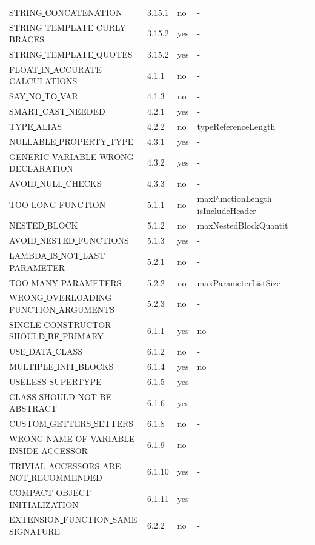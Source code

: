 \begin{center}
\begin{longtable}{ |l|p{0.8cm}|p{0.8cm}| p{3cm} | }
STRING\underline{ }CONCATENATION & 3.15.1 &  no  & - \\
STRING\underline{ }TEMPLATE\underline{ }CURLY\underline{ }BRACES & 3.15.2 &  yes  &  - \\
STRING\underline{ }TEMPLATE\underline{ }QUOTES & 3.15.2 &  yes  &  - \\
FLOAT\underline{ }IN\underline{ }ACCURATE\underline{ }CALCULATIONS & 4.1.1 &  no  &                          - \\
SAY\underline{ }NO\underline{ }TO\underline{ }VAR & 4.1.3 &  no  &  - \\
SMART\underline{ }CAST\underline{ }NEEDED & 4.2.1 &  yes  &  - \\
TYPE\underline{ }ALIAS & 4.2.2 &  no  &  typeReferenceLength       \\
NULLABLE\underline{ }PROPERTY\underline{ }TYPE & 4.3.1 &  yes  &  -                         \\
GENERIC\underline{ }VARIABLE\underline{ }WRONG\underline{ }DECLARATION & 4.3.2 &  yes  &  - \\
AVOID\underline{ }NULL\underline{ }CHECKS & 4.3.3 &  no  &  - \\
TOO\underline{ }LONG\underline{ }FUNCTION & 5.1.1 &  no  &  maxFunctionLength isIncludeHeader\\
NESTED\underline{ }BLOCK & 5.1.2 &  no  &  maxNestedBlockQuantit\\
AVOID\underline{ }NESTED\underline{ }FUNCTIONS & 5.1.3 &  yes  &  - \\
LAMBDA\underline{ }IS\underline{ }NOT\underline{ }LAST\underline{ }PARAMETER & 5.2.1 &  no  &  - \\
TOO\underline{ }MANY\underline{ }PARAMETERS & 5.2.2 &  no  &  maxParameterListSize \\
WRONG\underline{ }OVERLOADING\underline{ }FUNCTION\underline{ }ARGUMENTS & 5.2.3 &  no  &   -\\
SINGLE\underline{ }CONSTRUCTOR\underline{ }SHOULD\underline{ }BE\underline{ }PRIMARY & 6.1.1 &  yes  &  no \\
USE\underline{ }DATA\underline{ }CLASS & 6.1.2 &  no  &  - \\
MULTIPLE\underline{ }INIT\underline{ }BLOCKS & 6.1.4 &  yes  &  no \\
USELESS\underline{ }SUPERTYPE & 6.1.5 &  yes  &  - \\
CLASS\underline{ }SHOULD\underline{ }NOT\underline{ }BE\underline{ }ABSTRACT & 6.1.6 &  yes  &  - \\
CUSTOM\underline{ }GETTERS\underline{ }SETTERS & 6.1.8 &  no  &  - \\
WRONG\underline{ }NAME\underline{ }OF\underline{ }VARIABLE\underline{ }INSIDE\underline{ }ACCESSOR & 6.1.9 &  no  &  - \\
TRIVIAL\underline{ }ACCESSORS\underline{ }ARE\underline{ }NOT\underline{ }RECOMMENDED & 6.1.10 &  yes  &  - \\
COMPACT\underline{ }OBJECT\underline{ }INITIALIZATION & 6.1.11 &  yes  &   \\
EXTENSION\underline{ }FUNCTION\underline{ }SAME\underline{ }SIGNATURE & 6.2.2 &  no  &  - \\
\hline


\end{longtable}
\end{center}
